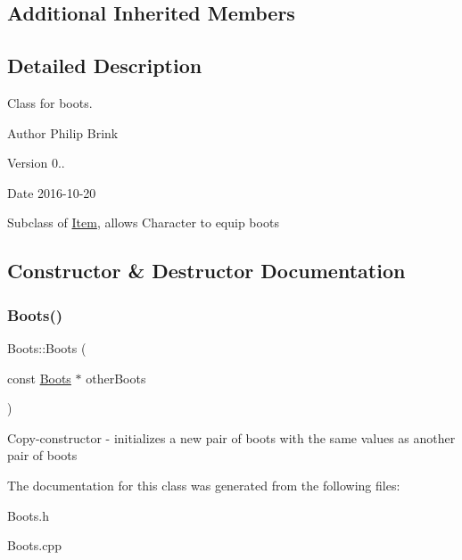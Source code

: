 \subsection*{Additional Inherited Members}


\subsection{Detailed Description}
Class for boots. 

\begin{DoxyAuthor}{Author}
Philip Brink 
\end{DoxyAuthor}
\begin{DoxyVersion}{Version}
0.. 
\end{DoxyVersion}
\begin{DoxyDate}{Date}
2016-\/10-\/20
\end{DoxyDate}
Subclass of \hyperlink{class_item}{Item}, allows Character to equip boots 

\subsection{Constructor \& Destructor Documentation}
\hypertarget{class_boots_ad3452c78ef60ba4d955e779560d5e5ba}{}\label{class_boots_ad3452c78ef60ba4d955e779560d5e5ba} 
\subsubsection{\texorpdfstring{Boots()}{Boots()}}
{\footnotesize\ttfamily Boots\+::\+Boots (\begin{DoxyParamCaption}\item[{const \hyperlink{class_boots}{Boots} $\ast$}]{other\+Boots }\end{DoxyParamCaption})}

Copy-\/constructor -\/ initializes a new pair of boots with the same values as another pair of boots 

The documentation for this class was generated from the following files\+:\begin{DoxyCompactItemize}
\item 
Boots.\+h\item 
Boots.\+cpp\end{DoxyCompactItemize}
